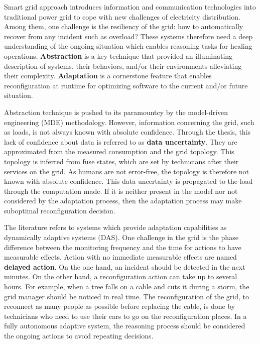 
\bigskip

Smart grid approach introduces information and communication technologies into traditional power grid to cope with new challenges of electricity distribution.
Among them, one challenge is the resiliency of the grid: how to automatically recover from any incident such as overload?
These systems therefore need a deep understanding of the ongoing situation which enables reasoning tasks for healing operations.
\textbf{Abstraction} is a key technique that provided an illuminating description of systems, their behaviors, and/or their environments alleviating their complexity.
\textbf{Adaptation} is a cornerstone feature that enables reconfiguration at runtime for optimizing software to the current and/or future situation.

Abstraction technique is pushed to its paramountcy by the model-driven engineering (MDE) methodology.
However, information concerning the grid, such as loads, is not always known with absolute confidence.
Through the thesis, this lack of confidence about data is referred to as \textbf{data uncertainty}.
They are approximated from the measured consumption and the grid topology.
This topology is inferred from fuse states, which are set by technicians after their services on the grid.
As humans are not error-free, the topology is therefore not known with absolute confidence.
This data uncertainty is propagated to the load through the computation made.
If it is neither present in the model nor not considered by the adaptation process, then the adaptation process may make suboptimal reconfiguration decision.

The literature refers to systems which provide adaptation capabilities as dynamically adaptive systems (DAS).
One challenge in the grid is the phase difference between the monitoring frequency and the time for actions to have measurable effects.
Action with no immediate measurable effects are named \textbf{delayed action}.
On the one hand, an incident should be detected in the next minutes.
On the other hand, a reconfiguration action can take up to several hours.
For example, when a tree falls on a cable and cuts it during a storm, the grid manager should be noticed in real time.
The reconfiguration of the grid, to reconnect as many people as possible before replacing the cable, is done by technicians who need to use their cars to go on the reconfiguration places.
In a fully autonomous adaptive system, the reasoning process should be considered the ongoing actions to avoid repeating decisions.

